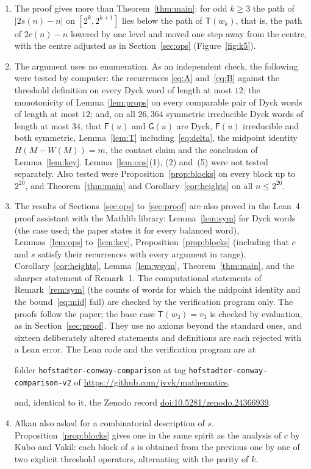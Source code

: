 \documentclass[11pt]{amsart}
\theoremstyle{definition}
\theoremstyle{remark}
\numberwithin{equation}{section}
\newcommand{\cF}{\mathsf F}
\newcommand{\cG}{\mathsf G}
\newcommand{\cT}{\mathsf T}
\begin{document}
\begin{enumerate}
\item The proof gives more than Theorem~\ref{thm:main}: for odd $k\ge3$ the path of $|2s(n)-n|$ on $[2^k,2^{k+1}]$ lies below the path of $\cT(w_k)$, that is, the path of $2c(n)-n$ lowered by one level and moved one step away from the centre, with the centre adjusted as in Section~\ref{sec:ops} (Figure~\ref{fig:k5}).
\item The argument uses no enumeration. As an independent check, the following were tested by computer: the recurrences \eqref{eq:A} and~\eqref{eq:B} against the threshold definition on every Dyck word of length at most $12$; the monotonicity of Lemma~\ref{lem:props} on every comparable pair of Dyck words of length at most $12$; and, on all $26{,}364$ symmetric irreducible Dyck words of length at most $34$, that $\cF(u)$ and $\cG(u)$ are Dyck, $\cF(u)$ irreducible and both symmetric, Lemma~\ref{lem:T} including~\eqref{eq:delta}, the midpoint identity $H(M-W(M))=m$, the contact claim and the conclusion of Lemma~\ref{lem:key}. Lemma~\ref{lem:ops}(1), (2) and~(5) were not tested separately. Also tested were Proposition~\ref{prop:blocks} on every block up to $2^{20}$, and Theorem~\ref{thm:main} and Corollary~\ref{cor:heights} on all $n\le2^{20}$.
\item The results of Sections~\ref{sec:ops} to~\ref{sec:proof} are also proved in the Lean~4 proof assistant with the Mathlib library: Lemma~\ref{lem:sym} for Dyck words (the case used; the paper states it for every balanced word), Lemmas~\ref{lem:ops} to~\ref{lem:key}, Proposition~\ref{prop:blocks} (including that $c$ and $s$ satisfy their recurrences with every argument in range), Corollary~\ref{cor:heights}, Lemma~\ref{lem:wsym}, Theorem~\ref{thm:main}, and the sharper statement of Remark~1. The computational statements of Remark~\ref{rem:sym} (the counts of words for which the midpoint identity and the bound~\eqref{eq:mid} fail) are checked by the verification program only. The proofs follow the paper; the base case $\cT(w_3)=v_3$ is checked by evaluation, as in Section~\ref{sec:proof}. They use no axioms beyond the standard ones, and sixteen deliberately altered statements and definitions are each rejected with a Lean error. The Lean code and the verification program are at
\begin{center}\small folder \texttt{hofstadter-conway-comparison} at tag \texttt{hofstadter-conway-comparison-v2} of \url{https://github.com/jvvk/mathematics},\end{center}
and, identical to it, the Zenodo record \href{https://doi.org/10.5281/zenodo.24366939}{doi:10.5281/zenodo.24366939}.
\item Alkan also asked for a combinatorial description of $s$. Proposition~\ref{prop:blocks} gives one in the same spirit as the analysis of $c$ by Kubo and Vakil: each block of $s$ is obtained from the previous one by one of two explicit threshold operators, alternating with the parity of $k$.
\end{enumerate}
\end{document}
